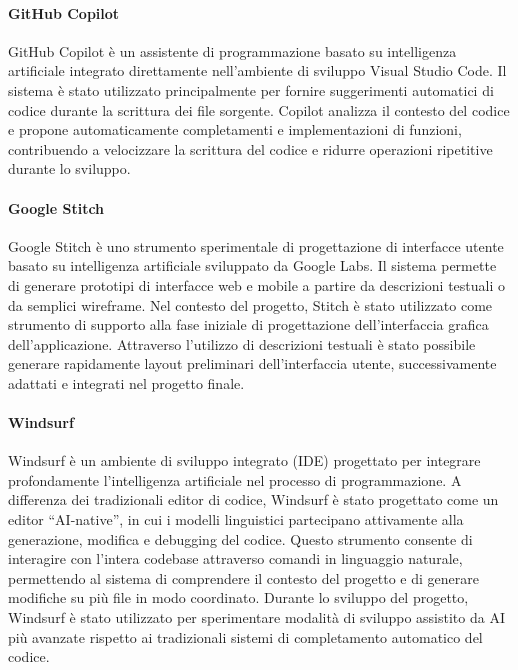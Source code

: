 \paragraph{GitHub Copilot}
GitHub Copilot è un assistente di programmazione basato su intelligenza artificiale integrato direttamente nell'ambiente di sviluppo Visual Studio Code. Il sistema è stato utilizzato principalmente per fornire suggerimenti automatici di codice durante la scrittura dei file sorgente.
Copilot analizza il contesto del codice e propone automaticamente completamenti e implementazioni di funzioni, contribuendo a velocizzare la scrittura del codice e ridurre operazioni ripetitive durante lo sviluppo.

\paragraph{Google Stitch}

Google Stitch è uno strumento sperimentale di progettazione di interfacce utente basato su intelligenza artificiale sviluppato da Google Labs. Il sistema permette di generare prototipi di interfacce web e mobile a partire da descrizioni testuali o da semplici wireframe.
Nel contesto del progetto, Stitch è stato utilizzato come strumento di supporto alla fase iniziale di progettazione dell'interfaccia grafica dell'applicazione. Attraverso l'utilizzo di descrizioni testuali è stato possibile generare rapidamente layout preliminari dell'interfaccia utente, successivamente adattati e integrati nel progetto finale.

\paragraph{Windsurf}
Windsurf è un ambiente di sviluppo integrato (IDE) progettato per integrare profondamente l'intelligenza artificiale nel processo di programmazione. A differenza dei tradizionali editor di codice, Windsurf è stato progettato come un editor ``AI-native'', in cui i modelli linguistici partecipano attivamente alla generazione, modifica e debugging del codice.
Questo strumento consente di interagire con l'intera codebase attraverso comandi in linguaggio naturale, permettendo al sistema di comprendere il contesto del progetto e di generare modifiche su più file in modo coordinato. Durante lo sviluppo del progetto, Windsurf è stato utilizzato per sperimentare modalità di sviluppo assistito da AI più avanzate rispetto ai tradizionali sistemi di completamento automatico del codice.

